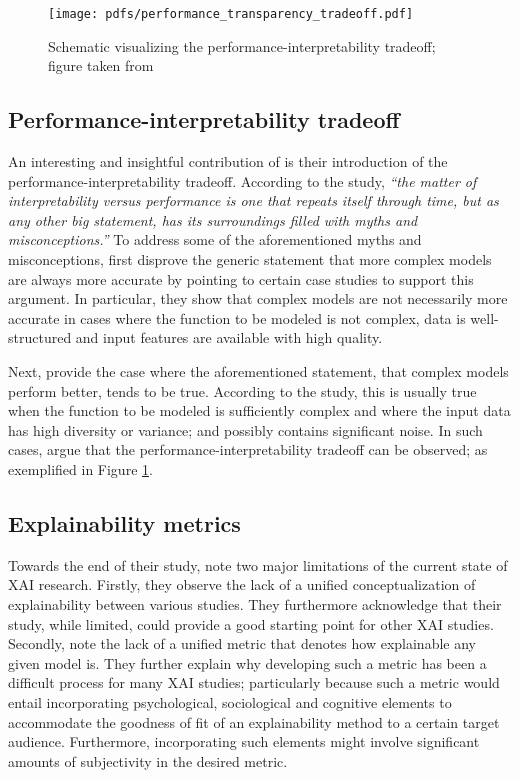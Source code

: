 \begin{figure}[t]
  \centering
  \texttt{[image: pdfs/performance\_transparency\_tradeoff.pdf]}
  \caption{Schematic visualizing the performance-interpretability tradeoff; figure taken from \citet{arrieta2020explainable}}
  \label{fig:performance_interpretability_tradeoff}
\end{figure}

\subsection{Performance-interpretability tradeoff}

An interesting and insightful contribution of \citet{arrieta2020explainable} is their introduction of the performance-interpretability tradeoff. According to the study, \textit{``the matter of interpretability versus performance is one that repeats itself through time, but as any other big statement, has its surroundings filled with myths and misconceptions.''} To address some of the aforementioned myths and misconceptions, \citet{arrieta2020explainable} first disprove the generic statement that more complex models are always more accurate by pointing to certain case studies to support this argument. In particular, they show that complex models are not necessarily more accurate in cases where the function to be modeled is not complex, data is well-structured and input features are available with high quality.

Next, \citet{arrieta2020explainable} provide the case where the aforementioned statement, that complex models perform better, tends to be true. According to the study, this is usually true when the function to be modeled is sufficiently complex and where the input data has high diversity or variance; and possibly contains significant noise. In such cases, \citet{arrieta2020explainable} argue that the performance-interpretability tradeoff can be observed; as exemplified in Figure \ref{fig:performance_interpretability_tradeoff}.
 
\subsection{Explainability metrics}

\label{section:xai-metrics}

Towards the end of their study, \citet{arrieta2020explainable} note two major limitations of the current state of XAI research. Firstly, they observe the lack of a unified conceptualization of explainability between various studies. They furthermore acknowledge that their study, while limited, could provide a good starting point for other XAI studies. Secondly, \citet{arrieta2020explainable} note the lack of a unified metric that denotes how explainable any given model is. They further explain why developing such a metric has been a difficult process for many XAI studies; particularly because such a metric would entail incorporating psychological, sociological and cognitive elements to accommodate the goodness of fit of an explainability method to a certain target audience. Furthermore, incorporating such elements might involve significant amounts of subjectivity in the desired metric.

